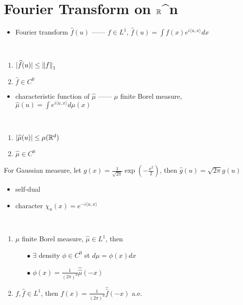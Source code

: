 \section{Fourier Transform on $\mathbb{R}$^n}\label{sec:fourier-transform-on^n}

\begin{itemize}
    \item Fourier transform $\widehat{f}(u)$ ------ $f \in L^1$, $\widehat{f}(u) = \int f(x) e^{i\langle u,x \rangle}dx$
\end{itemize}

\begin{prop}\,
    \begin{enumerate}
        \item $|\widehat{f}(u)| \leq \left\lVert f\right\rVert_1$
        \item $\widehat{f} \in C^0$
    \end{enumerate}
\end{prop}

\begin{itemize}
    \item characteristic function of $\widehat{\mu}$ ------ $\mu$ finite Borel measure, $\widehat{\mu}(u) = \int e^{i\langle u, x \rangle} d\mu(x)$
\end{itemize}

\begin{prop}\,
    \begin{enumerate}
        \item $|\widehat{\mu}(u)| \leq \mu(\mathbb{R}^d)$
        \item $\widehat{\mu} \in C^0$
    \end{enumerate}
\end{prop}

\begin{example}
    For Gaussian measure, let $g(x) = \frac{1}{\sqrt{2\pi}} \exp(-\frac{x^2}{2})$, then $\widehat{g}(u) = \sqrt{2\pi}g(u)$
\end{example}

\begin{itemize}
    \item self-dual
    \item character $\chi_u(x) = e^{-i\langle u, x \rangle}$
\end{itemize}

\begin{thm}\,
    \begin{enumerate}
        \item $\mu$ finite Borel measure, $\widehat{\mu} \in L^1$, then
        \begin{itemize}
            \item[$\bullet$] $\exists$ density $\phi \in C^0$ st $d\mu = \phi(x)dx$
            \item[$\bullet$] $\phi(x) = \frac{1}{(2\pi)^d}\widehat{\widehat{\mu}}(-x)$
        \end{itemize}
        \item $f, \widehat{f} \in L^1$, then $f(x) = \frac{1}{(2\pi)^d}\widehat{\widehat{f}}(-x)$ a.e.
    \end{enumerate}
\end{thm}

